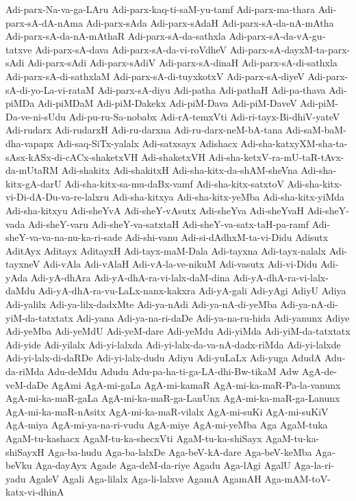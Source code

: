{Adi-parx-Na-va-ga-LAru
Adi-parx-kaq-ti-saM-yu-tamf
Adi-parx-ma-thara
Adi-parx-sA-dA-nAma
Adi-parx-sAda
Adi-parx-sAdaH
Adi-parx-sA-da-nA-mAtha
Adi-parx-sA-da-nA-mAthaR
Adi-parx-sA-da-sathxla
Adi-parx-sA-da-vA-gu-tatxve
Adi-parx-sA-dava
Adi-parx-sA-da-vi-roVdheV
Adi-parx-sA-dayxM-ta-parx-sAdi
Adi-parx-sAdi
Adi-parx-sAdiV
Adi-parx-sA-dinaH
Adi-parx-sA-di-sathxla
Adi-parx-sA-di-sathxlaM
Adi-parx-sA-di-tuyxkotxV
Adi-parx-sA-diyeV
Adi-parx-sA-di-yo-La-vi-rataM
Adi-parx-sA-diyu
Adi-patha
Adi-pathaH
Adi-pa-thava
Adi-piMDa
Adi-piMDaM
Adi-piM-Dakekx
Adi-piM-Dava
Adi-piM-DaveV
Adi-piM-Da-ve-ni-sUdu
Adi-pu-ru-Sa-nobabx
Adi-rA-temxVti
Adi-ri-tayx-Bi-dhiV-yateV
Adi-rudarx
Adi-rudarxH
Adi-ru-darxna
Adi-ru-darx-neM-bA-tana
Adi-saM-baM-dha-vapapx
Adi-saq-SiTx-yalalx
Adi-satxsayx
Adishacx
Adi-sha-katxyXM-sha-ta-sAsx-kASx-di-cACx-shaketxVH
Adi-shaketxVH
Adi-sha-ketxV-ra-mU-taR-tAvx-da-mUtaRM
Adi-shakitx
Adi-shakitxH
Adi-sha-kitx-da-shAM-sheVna
Adi-sha-kitx-gA-darU
Adi-sha-kitx-sa-mu-daBx-vamf
Adi-sha-kitx-satxtoV
Adi-sha-kitx-vi-Di-dA-Du-va-re-lalxru
Adi-sha-kitxya
Adi-sha-kitx-yeMba
Adi-sha-kitx-yiMda
Adi-sha-kitxyu
Adi-sheYvA
Adi-sheY-vAsutx
Adi-sheYva
Adi-sheYvaH
Adi-sheY-vada
Adi-sheY-varu
Adi-sheY-va-satxtaH
Adi-sheY-va-satx-taH-pa-ramf
Adi-sheY-va-va-na-nu-ka-ri-sade
Adi-shi-vanu
Adi-si-dAdhxM-ta-vi-Didu
Adisutx
AditAyx
Aditayx
AditayxH
Adi-tayx-maM-Dala
Adi-tayxna
Adi-tayx-nalalx
Adi-tayxneV
Adi-vAla
Adi-vAlaH
Adi-vA-la-ve-nikuM
Adi-vasutx
Adi-vi-Didu
Adi-yAda
Adi-yA-dhAra
Adi-yA-dhA-ra-vi-lalx-daM-dina
Adi-yA-dhA-ra-vi-lalx-daMdu
Adi-yA-dhA-ra-vu-LaLx-nanx-kakxra
Adi-yA-gali
Adi-yAgi
AdiyU
Adiya
Adi-yalilx
Adi-ya-lilx-dadxMte
Adi-ya-nAdi
Adi-ya-nA-di-yeMba
Adi-ya-nA-di-yiM-da-tatxtatx
Adi-yana
Adi-ya-na-ri-daDe
Adi-ya-na-ru-hida
Adi-yanunx
Adiye
Adi-yeMba
Adi-yeMdU
Adi-yeM-dare
Adi-yeMdu
Adi-yiMda
Adi-yiM-da-tatxtatx
Adi-yide
Adi-yilalx
Adi-yi-lalxda
Adi-yi-lalx-da-va-nA-dadx-riMda
Adi-yi-lalxde
Adi-yi-lalx-di-daRDe
Adi-yi-lalx-dudu
Adiyu
Adi-yuLaLx
Adi-yuga
AdudA
Adu-da-riMda
Adu-deMdu
Adudu
Adu-pa-ha-ti-ga-LA-dhi-Bw-tikaM
Adw
AgA-de-veM-daDe
AgAmi
AgA-mi-gaLa
AgA-mi-kamaR
AgA-mi-ka-maR-Pa-la-vanunx
AgA-mi-ka-maR-gaLa
AgA-mi-ka-maR-ga-LanUnx
AgA-mi-ka-maR-ga-Lanunx
AgA-mi-ka-maR-nAsitx
AgA-mi-ka-maR-vilalx
AgA-mi-suKi
AgA-mi-suKiV
AgA-miya
AgA-mi-ya-na-ri-vudu
AgA-miye
AgA-mi-yeMba
Aga
AgaM-tuka
AgaM-tu-kashacx
AgaM-tu-ka-shecxVti
AgaM-tu-ka-shiSayx
AgaM-tu-ka-shiSayxH
Aga-ba-hudu
Aga-ba-lalxDe
Aga-beV-kA-dare
Aga-beV-keMba
Aga-beVku
Aga-dayAyx
Agade
Aga-deM-da-riye
Agadu
Aga-lAgi
AgalU
Aga-la-ri-yadu
AgaleV
Agali
Aga-lilalx
Aga-li-lalxve
AgamA
AgamAH
Aga-mAM-toV-katx-vi-dhinA
}
